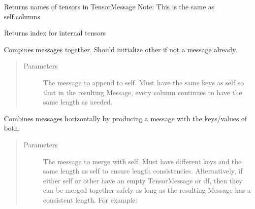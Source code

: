 \documentclass[letterpaper,10pt,english]{sphinxmanual}
\begin{document}
\begin{fulllineitems}
\begin{fulllineitems}
\end{fulllineitems}


\begin{fulllineitems}
\label{\detokenize{Fireworks:Fireworks.core.message.Message.keys}}
Returns names of tensors in TensorMessage
Note: This is the same as self.columns

\end{fulllineitems}


\begin{fulllineitems}
\label{\detokenize{Fireworks:Fireworks.core.message.Message.index}}
Returns index for internal tensors

\end{fulllineitems}


\begin{fulllineitems}
\label{\detokenize{Fireworks:Fireworks.core.message.Message.append}}
Compines messages together.
Should initialize other if not a message already.
\begin{quote}\begin{description}
\item[{Parameters}] \leavevmode
{} \textendash{} The message to append to self. Must have the same keys as self so that in the resulting Message,
every column continues to have the same length as needed.

\end{description}\end{quote}

\end{fulllineitems}


\begin{fulllineitems}
\label{\detokenize{Fireworks:Fireworks.core.message.Message.merge}}
Combines messages horizontally by producing a message with the keys/values of both.
\begin{quote}\begin{description}
\item[{Parameters}] \leavevmode
{} \textendash{} 
The message to merge with self. Must have different keys and the same length as self to ensure length consistencies.
Alternatively, if either self or other have an empty TensorMessage or df, then they can be merged together safely as long
as the resulting Message has a consistent length.
For example:


\end{description}
\end{quote}
\end{fulllineitems}
\end{fulllineitems}
\end{document}
